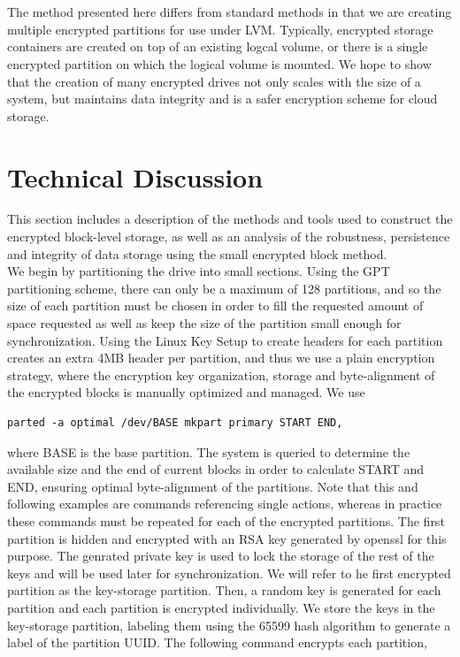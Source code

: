 \documentclass[12pt]{article}
\begin{document}
~\\~\\
The method presented here differs from standard methods in that we are creating multiple encrypted partitions for use under LVM. Typically, encrypted storage containers are created on top of an existing logcal volume, or there is a single encrypted partition on which the logical volume is mounted. We hope to show that the creation of many encrypted drives not only scales with the size of a system, but maintains data integrity and is a safer encryption scheme for cloud storage.

\section{Technical Discussion}

This section includes a description of the methods and tools used to construct the encrypted block-level storage, as well as an analysis of the robustness, persistence and integrity of data storage using the small encrypted block method.
~\\
We begin by partitioning the drive into small sections. Using the GPT partitioning scheme, there can only be a maximum of 128 partitions, and so the size of each partition must be chosen in order to fill the requested amount of space requested as well as keep the size of the partition small enough for synchronization. Using the Linux Key Setup to create headers for each partition creates an extra 4MB header per partition, and thus we use a plain encryption strategy, where the encryption key organization, storage and byte-alignment of the encrypted blocks is manually optimized and managed. We use
\begin{verbatim}
parted -a optimal /dev/BASE mkpart primary START END,
\end{verbatim}
where BASE is the base partition. The system is queried to determine the available size and the end of current blocks in order to calculate START and END, ensuring optimal byte-alignment of the partitions. Note that this and following examples are commands referencing single actions, whereas in practice these commands must be repeated for each of the encrypted partitions. The first partition is hidden and encrypted with an RSA key generated by openssl for this purpose. The genrated private key is used to lock the storage of the rest of the keys and will be used later for synchronization. We will refer to he first encrypted partition as the key-storage partition. Then, a random key is generated for each partition and each partition is encrypted individually. We store the keys in the key-storage partition, labeling them using the 65599 hash algorithm to generate a label of the partition UUID. The following command encrypts each partition,
\end{document}
